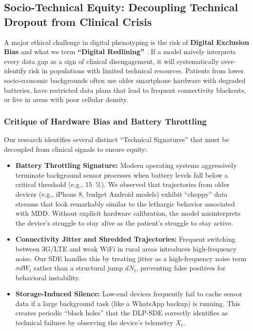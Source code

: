 \subsection{Socio-Technical Equity: Decoupling Technical Dropout from Clinical Crisis}
A major ethical challenge in digital phenotyping is the risk of \textbf{Digital Exclusion Bias} and what we term \textbf{``Digital Redlining''} \cite{schultebraucks2025llms}. If a model naively interprets every data gap as a sign of clinical disengagement, it will systematically over-identify risk in populations with limited technical resources. Patients from lower socio-economic backgrounds often use older smartphone hardware with degraded batteries, have restricted data plans that lead to frequent connectivity blackouts, or live in areas with poor cellular density.

\subsubsection{Critique of Hardware Bias and Battery Throttling}
Our research identifies several distinct ``Technical Signatures'' that must be decoupled from clinical signals to ensure equity:
\begin{itemize}
    \item \textbf{Battery Throttling Signature:} Modern operating systems aggressively terminate background sensor processes when battery levels fall below a critical threshold (e.g., \SI{15}{\percent}). We observed that trajectories from older devices (e.g., iPhone 8, budget Android models) exhibit ``choppy'' data streams that look remarkably similar to the lethargic behavior associated with MDD. Without explicit hardware calibration, the model misinterprets the device's struggle to stay alive as the patient's struggle to stay active.
    \item \textbf{Connectivity Jitter and Shredded Trajectories:} Frequent switching between 3G/LTE and weak WiFi in rural areas introduces high-frequency noise. Our SDE handles this by treating jitter as a high-frequency noise term $\sigma dW_t$ rather than a structural jump $dN_t$, preventing false positives for behavioral instability.
    \item \textbf{Storage-Induced Silence:} Low-end devices frequently fail to cache sensor data if a large background task (like a WhatsApp backup) is running. This creates periodic ``black holes'' that the DLP-SDE correctly identifies as technical failures by observing the device's telemetry $X_t$.
\end{itemize}

